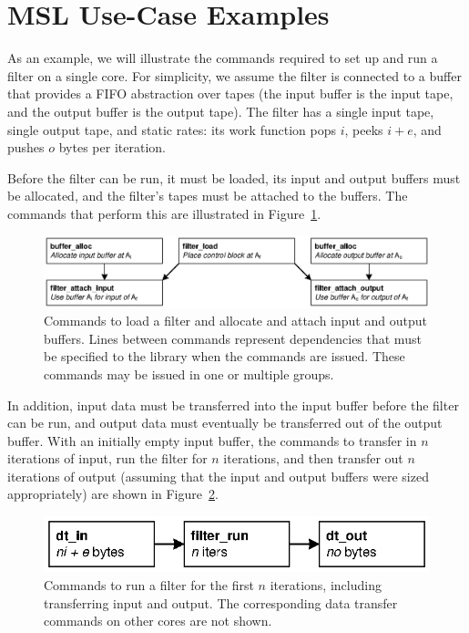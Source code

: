 \section{MSL Use-Case Examples}

As an example, we will illustrate the commands required to set up and
run a filter on a single core. For simplicity, we assume the filter is
connected to a buffer that provides a FIFO abstraction over tapes (the
input buffer is the input tape, and the output buffer is the output
tape). The filter has a single input tape, single output tape, and
static rates: its work function pops $i$, peeks $i+e$, and pushes $o$
bytes per iteration.

Before the filter can be run, it must be loaded, its input and output
buffers must be allocated, and the filter's tapes must be attached to the
buffers. The commands that perform this are illustrated in
Figure~\ref{fig:lib:init}.

\begin{figure}[!htb]
\begin{center}
\includegraphics[scale=.55]{figs/init}
\end{center}
\caption[Commands to set up a filter.]{Commands to load a filter and allocate and attach input and output buffers. Lines between commands represent dependencies that must be specified to the library when the commands are issued. These commands may be issued in one or multiple groups.}
\label{fig:lib:init}
\end{figure}

In addition, input data must be transferred into the input buffer before the filter can be run, and output data must eventually be transferred out of the output buffer. With an initially empty input buffer, the commands to transfer in $n$ iterations of input, run the filter for $n$ iterations, and then transfer out $n$ iterations of output (assuming that the input and output buffers were sized appropriately) are shown in Figure~\ref{fig:lib:run}.

\begin{figure}[!htb]
\begin{center}
\includegraphics{figs/run}
\end{center}
\caption[Commands to run a filter.]{Commands to run a filter for the
  first $n$ iterations, including transferring input and output. The
  corresponding data transfer commands on other cores are not shown.}
\label{fig:lib:run}
\end{figure}


